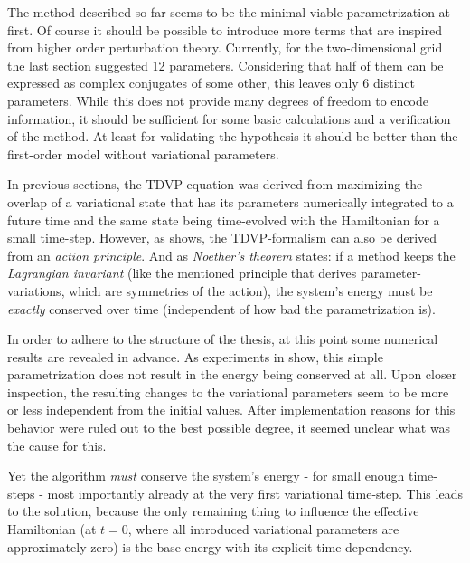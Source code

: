 The method described so far seems to be the minimal viable parametrization at first.
Of course it should be possible to introduce more terms that are inspired from higher order perturbation theory.
Currently, for the two-dimensional grid the last section suggested 12 parameters. 
Considering that half of them can be expressed as complex conjugates of some other, this leaves only 6 distinct parameters.
While this does not provide many degrees of freedom to encode information, it should be sufficient for some basic calculations and a verification of the method.
At least for validating the hypothesis it should be better than the first-order model without variational parameters.

In previous sections, the TDVP-equation was derived from maximizing the overlap of a variational state that has its parameters numerically integrated to a future time and the same state being time-evolved with the Hamiltonian for a small time-step.
However, as \cite{TDVPcomplexPrefactors} shows, the TDVP-formalism can also be derived from an \emph{action principle}.
And as \emph{Noether's theorem} states: if a method keeps the \emph{Lagrangian invariant} (like the mentioned principle that derives parameter-variations, which are symmetries of the action), the system's energy must be \emph{exactly} conserved over time \cite{energyConservationFromActionPrinciple} (independent of how \glqq bad\grqq{} the parametrization is).

In order to adhere to the structure of the thesis, at this point some numerical results are revealed in advance. 
As experiments in  show, this simple parametrization does not result in the energy being conserved at all.
Upon closer inspection, the resulting changes to the variational parameters seem to be more or less independent from the initial values.
After implementation reasons for this behavior were ruled out to the best possible degree, it seemed unclear what was the cause for this.

Yet the algorithm \emph{must} conserve the system's energy - for small enough time-steps - most importantly already at the very first variational time-step.
This leads to the solution, because the only remaining thing to influence the effective Hamiltonian (at $t=0$, where all introduced variational parameters are approximately zero) is the base-energy with its explicit time-dependency.

